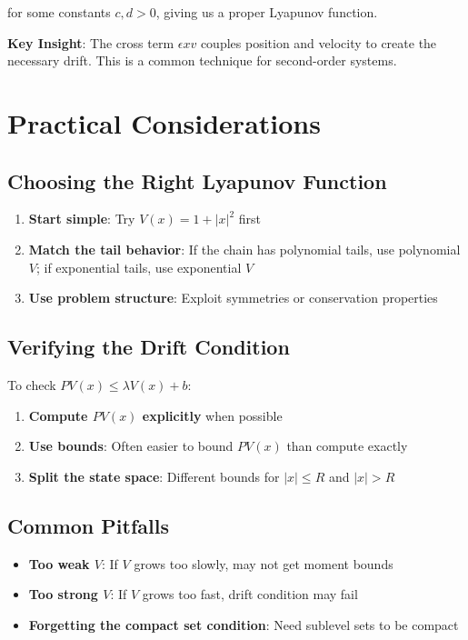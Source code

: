 \documentclass{amsart}
\theoremstyle{plain}
\theoremstyle{definition}
\theoremstyle{remark}
\begin{document}
for some constants $c, d > 0$, giving us a proper Lyapunov function.

\textbf{Key Insight}: The cross term $\epsilon xv$ couples position and velocity to create the necessary drift. This is a common technique for second-order systems.

\section{Practical Considerations}

\subsection{Choosing the Right Lyapunov Function}

\begin{enumerate}
	\item \textbf{Start simple}: Try $V(x) = 1 + |x|^2$ first
	\item \textbf{Match the tail behavior}: If the chain has polynomial tails, use polynomial $V$; if exponential tails, use exponential $V$
	\item \textbf{Use problem structure}: Exploit symmetries or conservation properties
\end{enumerate}

\subsection{Verifying the Drift Condition}

To check $PV(x) \leq \lambda V(x) + b$:

\begin{enumerate}
	\item \textbf{Compute $PV(x)$ explicitly} when possible
	\item \textbf{Use bounds}: Often easier to bound $PV(x)$ than compute exactly
	\item \textbf{Split the state space}: Different bounds for $|x| \leq R$ and $|x| > R$
\end{enumerate}

\subsection{Common Pitfalls}

\begin{itemize}
	\item \textbf{Too weak $V$}: If $V$ grows too slowly, may not get moment bounds
	\item \textbf{Too strong $V$}: If $V$ grows too fast, drift condition may fail
	\item \textbf{Forgetting the compact set condition}: Need sublevel sets to be compact
\end{itemize}
\end{document}

